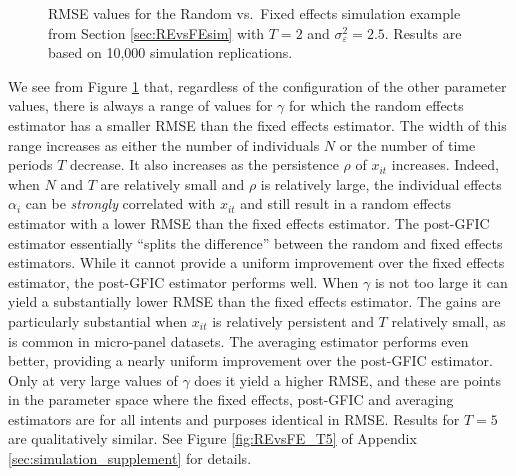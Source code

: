 \begin{figure}[htbp]
  \centering
  
  \caption{RMSE values for the Random vs.\ Fixed effects simulation example from Section \ref{sec:REvsFEsim} with $T=2$ and  $\sigma_{\varepsilon}^2 = 2.5$. Results are based on 10,000 simulation replications.}
  \label{fig:REvsFE_T2}
\end{figure}

We see from Figure \ref{fig:REvsFE_T2} that, regardless of the configuration of the other parameter values, there is always a range of values for $\gamma$ for which the random effects estimator has a smaller RMSE than the fixed effects estimator.
The width of this range increases as either the number of individuals $N$ or the number of time periods $T$ decrease.
It also increases as the persistence $\rho$ of $x_{it}$ increases.
Indeed, when $N$ and $T$ are relatively small and $\rho$ is relatively large, the individual effects $\alpha_{i}$ can be \emph{strongly} correlated with $x_{it}$ and still result in a random effects estimator with a lower RMSE than the fixed effects estimator. 
The post-GFIC estimator essentially ``splits the difference'' between the random and fixed effects estimators.
While it cannot provide a uniform improvement over the fixed effects estimator, the post-GFIC estimator performs well.
When $\gamma$ is not too large it can yield a substantially lower RMSE than the fixed effects estimator.
The gains are particularly substantial when $x_{it}$ is relatively persistent and $T$ relatively small, as is common in micro-panel datasets.
The averaging estimator performs even better, providing a nearly uniform improvement over the post-GFIC estimator.
Only at very large values of $\gamma$ does it yield a higher RMSE, and these are points in the parameter space where the fixed effects, post-GFIC and averaging estimators are for all intents and purposes identical in RMSE.
Results for $T=5$ are qualitatively similar.
See Figure \ref{fig:REvsFE_T5} of Appendix \ref{sec:simulation_supplement} for details.
